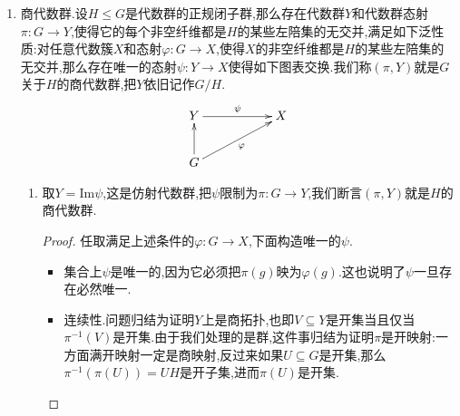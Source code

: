 \begin{enumerate}
\begin{proof}
    	\qquad
    	
    	考虑$\mathrm{End}(V)=\mathfrak{gl}(V)$的全部固定每个$V_{\chi},\chi\in X(\varphi(N))$的自同态子空间$W=\coprod_{\chi}\mathrm{End}(V_{\chi})$.我们知道$\mathrm{GL}(V)$伴随作用在$\mathfrak{gl}(V)$上,也即共轭作用.按照$\varphi(G)$在$\{V_{\chi}\}$上是置换作用,就有$\varphi(G)$固定了$W$.于是子表示是群同态$\psi:G\to\mathrm{GL}(W)$.它是如下代数群态射的复合限制在不变子空间$W$上,从而是有理表示:
    	$$\xymatrix{G\ar[r]^{\varphi}&\mathrm{GL}(V)\ar[r]^{\mathrm{Ad}}&\mathfrak{gl}(V)}$$
    	
    	计算$\ker\psi$.任取$n\in N$,那么$n$在每个$V_{\chi}$上的作用都是数乘,所以它和$\mathfrak{gl}(V)$中的矩阵可交换,也即$n\in\ker\psi$.反过来任取$g\in\ker\psi$,那么$g$固定了每个$V_{\chi}$,并且和$\mathrm{End}V_{\chi}$可交换,迫使$g$在每个$V_{\chi}$上是数乘,特别的$g$固定了$L\subseteq V_{\chi_0}$,于是$g\in N$.
    	
    	\qquad
    	
    	计算$\ker\mathrm{d}\psi$.任取$w\in\mathfrak{n}$,那么$\mathrm{d}\varphi(w)$作用在每个$V_{\chi}$上都是数乘.这样的矩阵和$\mathfrak{gl}(V)$中每个元可交换,进而$\mathrm{ad}(\mathrm{d}\varphi(w))=0$,于是$w\in\ker\mathrm{d}\psi$.反过来任取$v\in\ker\mathrm{d}\psi$,那么$\mathrm{ad}(\mathrm{d}\varphi(v))$在$W$上的作用为零,于是$\mathrm{d}\varphi(v)$固定每个$V_{\chi}$并且和每个$V_{\chi}$交换,于是它在每个$V_{\chi}$上的作用是数乘,特别的$\mathrm{d}\varphi(v)L\subseteq L$,于是$v\in\mathfrak{n}$.
    \end{proof}
    \item 商代数群.设$H\le G$是代数群的正规闭子群,那么存在代数群$Y$和代数群态射$\pi:G\to Y$,使得它的每个非空纤维都是$H$的某些左陪集的无交并,满足如下泛性质:对任意代数簇$X$和态射$\varphi:G\to X$,使得$X$的非空纤维都是$H$的某些左陪集的无交并,那么存在唯一的态射$\psi:Y\to X$使得如下图表交换.我们称$(\pi,Y)$就是$G$关于$H$的商代数群,把$Y$依旧记作$G/H$.
    $$\xymatrix{Y\ar[rr]^{\psi}&&X\\G\ar[u]\ar[urr]_{\varphi}&&}$$
    \begin{enumerate}[(1)]
    	\item 取$Y=\mathrm{Im}\psi$,这是仿射代数群,把$\psi$限制为$\pi:G\to Y$,我们断言$(\pi,Y)$就是$H$的商代数群.
    	\begin{proof}
    		
    		任取满足上述条件的$\varphi:G\to X$,下面构造唯一的$\psi$.
    		\begin{itemize}
    			\item 集合上$\psi$是唯一的,因为它必须把$\pi(g)$映为$\varphi(g)$.这也说明了$\psi$一旦存在必然唯一.
    			\item 连续性.问题归结为证明$Y$上是商拓扑,也即$V\subseteq Y$是开集当且仅当$\pi^{-1}(V)$是开集.由于我们处理的是群,这件事归结为证明$\pi$是开映射:一方面满开映射一定是商映射,反过来如果$U\subseteq G$是开集,那么$\pi^{-1}(\pi(U))=UH$是开子集,进而$\pi(U)$是开集.
    			

\end{itemize}
\end{proof}
\end{enumerate}
\end{enumerate}
